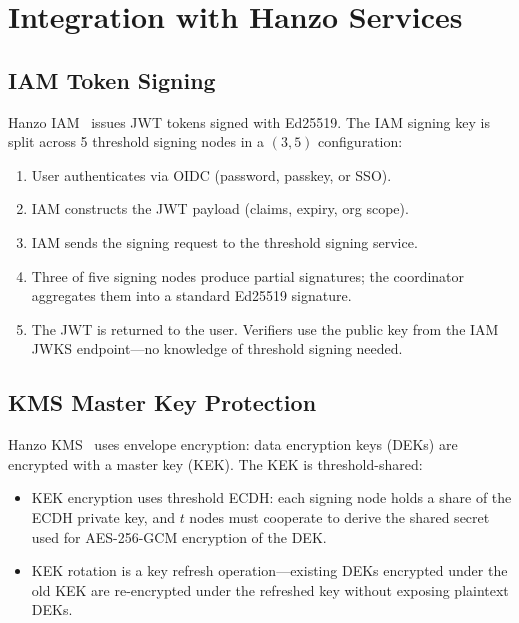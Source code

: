\section{Integration with Hanzo Services}

\label{sec:services}

\subsection{IAM Token Signing}

Hanzo IAM~\cite{hanzoiam} issues JWT tokens signed with Ed25519. The IAM
signing key is split across 5 threshold signing nodes in a $(3, 5)$
configuration:

\begin{enumerate}[leftmargin=1.4em]
    \item User authenticates via OIDC (password, passkey, or SSO).
    \item IAM constructs the JWT payload (claims, expiry, org scope).
    \item IAM sends the signing request to the threshold signing service.
    \item Three of five signing nodes produce partial signatures; the
    coordinator aggregates them into a standard Ed25519 signature.
    \item The JWT is returned to the user. Verifiers use the public key
    from the IAM JWKS endpoint---no knowledge of threshold signing needed.
\end{enumerate}

\subsection{KMS Master Key Protection}

Hanzo KMS~\cite{hanzokms} uses envelope encryption: data encryption keys (DEKs)
are encrypted with a master key (KEK). The KEK is threshold-shared:
\begin{itemize}[leftmargin=1.1em]
    \item KEK encryption uses threshold ECDH: each signing node holds a share
    of the ECDH private key, and $t$ nodes must cooperate to derive the shared
    secret used for AES-256-GCM encryption of the DEK.
    \item KEK rotation is a key refresh operation---existing DEKs encrypted
    under the old KEK are re-encrypted under the refreshed key without
    exposing plaintext DEKs.
\end{itemize}

